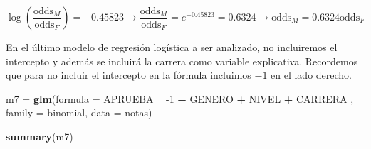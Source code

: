 \documentclass[
]{krantz}
\makeatletter
\newenvironment{Shaded}{\begin{snugshade}}{\end{snugshade}}
\newcommand{\DataTypeTok}[1]{\textcolor[rgb]{0.27,0.27,0.27}{#1}}
\newcommand{\DecValTok}[1]{\textcolor[rgb]{0.06,0.06,0.06}{#1}}
\newcommand{\KeywordTok}[1]{\textcolor[rgb]{0.27,0.27,0.27}{\textbf{#1}}}
\newcommand{\NormalTok}[1]{#1}
\newcommand{\OperatorTok}[1]{\textcolor[rgb]{0.43,0.43,0.43}{\textbf{#1}}}
\newcommand{\StringTok}[1]{\textcolor[rgb]{0.5,0.5,0.5}{#1}}
\newenvironment{kframe}{%
\medskip{}
\setlength{\fboxsep}{.8em}
 \def\at@end@of@kframe{}%
 \ifinner\ifhmode%
  \def\at@end@of@kframe{\end{minipage}}%
  \begin{minipage}{\columnwidth}%
 \fi\fi%
 \def\FrameCommand##1{\hskip\@totalleftmargin \hskip-\fboxsep
 \colorbox{shadecolor}{##1}\hskip-\fboxsep
     \hskip-\linewidth \hskip-\@totalleftmargin \hskip\columnwidth}%
 \MakeFramed {\advance\hsize-\width
   \@totalleftmargin\z@ \linewidth\hsize
   \@setminipage}}%
 {\par\unskip\endMakeFramed%
 \at@end@of@kframe}
\renewenvironment{Shaded}{\begin{kframe}}{\end{kframe}}
\makeatother
\begin{document}
\[\log \left( \dfrac{\text{odds}_{M}}{\text{odds}_{F}}\right)=-0.45823 \rightarrow \dfrac{\text{odds}_{M}}{\text{odds}_{F}}=e^{-0.45823}=0.6324\rightarrow \text{odds}_{M} = 0.6324\text{odds}_{F}\]

En el último modelo de regresión logística a ser analizado, no incluiremos el intercepto y además se incluirá la carrera como variable explicativa. Recordemos que para no incluir el intercepto en la fórmula incluimos \(-1\) en el lado derecho.

\begin{Shaded}
\begin{Highlighting}[]
\NormalTok{m7 =}\StringTok{ }\KeywordTok{glm}\NormalTok{(}\DataTypeTok{formula =}\NormalTok{ APRUEBA }\OperatorTok{~}\StringTok{ }\DecValTok{-1} \OperatorTok{+}\StringTok{ }\NormalTok{GENERO }\OperatorTok{+}\StringTok{ }\NormalTok{NIVEL }\OperatorTok{+}\StringTok{ }\NormalTok{CARRERA , }\DataTypeTok{family =}\NormalTok{ binomial, }\DataTypeTok{data =}\NormalTok{ notas)}

\KeywordTok{summary}\NormalTok{(m7)}
\end{Highlighting}
\end{Shaded}
\end{document}
